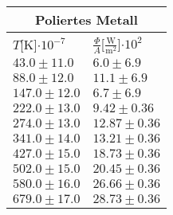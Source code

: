 \documentclass{article}
\begin{document}
\begin{tabular}{|p{3cm}|p{3cm}|}
\hline
\multicolumn{2}{|c|}{Poliertes Metall}\\
\hline
$T$[K]$\cdot 10^{-7}$&$\frac{\Phi}{A}$[$\frac{\textrm{W}}{\textrm{m}^2}$]$\cdot 10^{2}$\\
\hline
$43.0\pm11.0$&$6.0\pm 6.9$\\
$88.0\pm12.0$&$11.1\pm 6.9$\\
$147.0\pm12.0$&$6.7\pm 6.9$\\
$222.0\pm13.0$&$9.42\pm 0.36$\\
$274.0\pm13.0$&$12.87\pm 0.36$\\
$341.0\pm14.0$&$13.21\pm 0.36$\\
$427.0\pm15.0$&$18.73\pm 0.36$\\
$502.0\pm15.0$&$20.45\pm 0.36$\\
$580.0\pm16.0$&$26.66\pm 0.36$\\
$679.0\pm17.0$&$28.73\pm 0.36$\\
\hline
\end{tabular}
\end{document}
